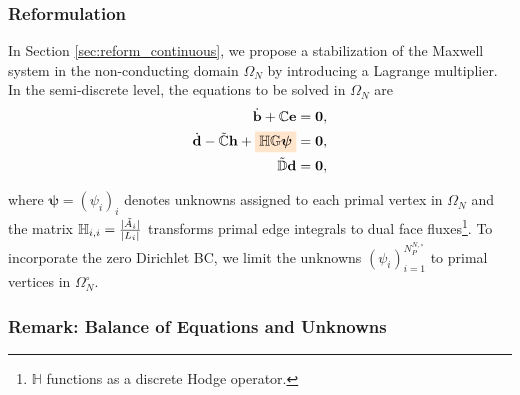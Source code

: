 \documentclass{article}
\begin{document}
\subsubsection{Reformulation} \label{sec:reform_discrete}
In Section \ref{sec:reform_continuous}, we propose a stabilization of the Maxwell system in the non-conducting domain $\Omega_N$ by introducing a Lagrange multiplier. In the semi-discrete level, the equations to be solved in $\Omega_N$ are
\begin{subequations}
    \begin{align}
        \dot{\mathbf{b}} + \mathbb{C}\mathbf{e} &= \mathbf{0} ,\\
        \dot{\mathbf{d}} - \Tilde{\mathbb{C}}\mathbf{h} + \colorbox{orange!20}{$\mathbb{H} \mathbb{G} \bm{\psi}$}&= \mathbf{0},\\
        \Tilde{\mathbb{D}}\mathbf{d} &= \mathbf{0} \label{equ:discrete_zero_div}, 
    \end{align} 
\end{subequations}

where $\bm{\psi} = (\psi_i)_i$ denotes unknowns assigned to each primal vertex in $\Omega_N$ and the matrix $\mathbb{H}_{i,i} = \frac{|\Tilde{A}_i|}{|L_i|}$ transforms primal edge integrals to dual face fluxes\footnote{$\mathbb{H}$ functions as a discrete Hodge operator.}. To incorporate the zero Dirichlet BC, we limit the unknowns $(\psi_i)_{i=1}^{N^{N,\circ}_P}$ to primal vertices in $\Omega_N^\circ$.

\subsubsection{Remark: Balance of Equations and Unknowns}
\end{document}
